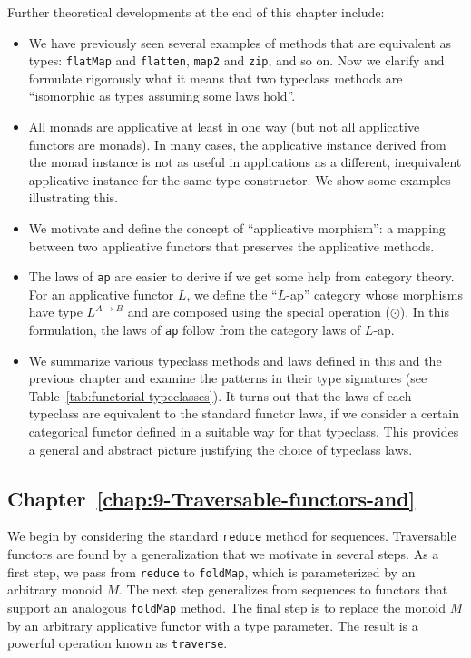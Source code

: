 Further theoretical developments at the end of this chapter include:
\begin{itemize}
\item We have previously seen several examples of methods that are equivalent
as types: \lstinline!flatMap! and \lstinline!flatten!, \lstinline!map2!
and \lstinline!zip!, and so on. Now we clarify and formulate rigorously
what it means that two typeclass methods are \textsf{``}isomorphic as types
assuming some laws hold\textsf{''}.
\item All monads are applicative at least in one way (but not all applicative
functors are monads). In many cases, the applicative instance derived
from the monad instance is not as useful in applications as a different,
inequivalent applicative instance for the same type constructor. We
show some examples illustrating this.
\item We motivate and define the concept of \textsf{``}applicative morphism\textsf{''}:
a mapping between two applicative functors that preserves the applicative
methods.
\item The laws of \lstinline!ap! are easier to derive if we get some help
from category theory. For an applicative functor $L$, we define the
\textsf{``}$L$-ap\textsf{''} category whose morphisms have type $L^{A\rightarrow B}$
and are composed using the special operation ($\odot$). In this formulation,
the laws of \lstinline!ap! follow from the category laws of $L$-ap.
\item We summarize various typeclass methods and laws defined in this and
the previous chapter and examine the patterns in their type signatures
(see Table~\ref{tab:functorial-typeclasses}). It turns out that
the laws of each typeclass are equivalent to the standard functor
laws, if we consider a certain categorical functor defined in a suitable
way for that typeclass. This provides a general and abstract picture
justifying the choice of typeclass laws.
\end{itemize}

\subsection{Chapter~\ref{chap:9-Traversable-functors-and}}

We begin by considering the standard \lstinline!reduce! method for
sequences. Traversable functors are found by a generalization that
we motivate in several steps. As a first step, we pass from \lstinline!reduce!
to \lstinline!foldMap!, which is parameterized by an arbitrary monoid
$M$. The next step generalizes from sequences to functors that support
an analogous \lstinline!foldMap! method. The final step is to replace
the monoid $M$ by an arbitrary applicative functor with a type parameter.
The result is a powerful operation known as \lstinline!traverse!.

